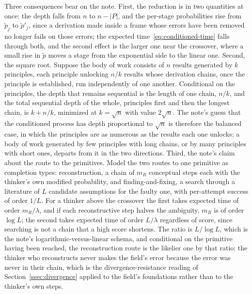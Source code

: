 \documentclass{article}
\begin{document}
Three consequences bear on the note. First, the reduction is in two quantities at once: the depth falls from $n$ to $n - |P|$, and the per-stage probabilities rise from $\widetilde{p}_j$ to $\widetilde{p}'_j$, since a derivation made inside a frame whose errors have been removed no longer fails on those errors; the expected time~\eqref{eq:conditioned-time} falls through both, and the second effect is the larger one near the crossover, where a small rise in $\widetilde{p}$ moves a stage from the exponential side to the linear one. Second, the square root. Suppose the body of work consists of $n$ results generated by $k$ principles, each principle unlocking $n/k$ results whose derivation chains, once the principle is established, run independently of one another. Conditional on the principles, the depth that remains sequential is the length of one chain, $n/k$, and the total sequential depth of the whole, principles first and then the longest chain, is $k + n/k$, minimized at $k = \sqrt{n}$ with value $2\sqrt{n}$. The note's guess that the conditioned process has depth proportional to $\sqrt{n}$ is therefore the balanced case, in which the principles are as numerous as the results each one unlocks; a body of work generated by few principles with long chains, or by many principles with short ones, departs from it in the two directions. Third, the note's claim about the route to the primitives. Model the two routes to one primitive as completion types: reconstruction, a chain of $m_R$ conceptual steps each with the thinker's own modified probability, and finding-and-fixing, a search through a literature of $L$ candidate assumptions for the faulty one, with per-attempt success of order $1/L$. For a thinker above the crossover the first takes expected time of order $m_R/\lambda$, and if each reconstructive step halves the ambiguity, $m_R$ is of order $\log L$; the second takes expected time of order $L/\lambda$ regardless of score, since searching is not a chain that a high score shortens. The ratio is $L/\log L$, which is the note's logarithmic-versus-linear schema, and conditional on the primitive having been reached, the reconstruction route is the likelier one by that ratio: the thinker who reconstructs never makes the field's error because the error was never in their chain, which is the divergence-resistance reading of Section~\ref{ssec:divergence} applied to the field's foundations rather than to the thinker's own steps.
\end{document}
